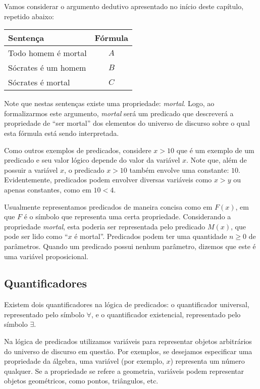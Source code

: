\begin{Example}
Vamos considerar o argumento dedutivo apresentado no início deste
capítulo, repetido abaixo:

\begin{table}[h]
  \begin{tabular}{|l|c|}
    \hline
    Sentença & Fórmula \\ \hline
    Todo homem é mortal & $A$ \\
    Sócrates é um homem & $B$ \\
    Sócrates é mortal & $C$ \\\hline
  \end{tabular}
  \centering
\end{table}
Note que nestas sentenças existe uma propriedade:
\textit{mortal}. Logo, ao formalizarmos este argumento,
\textit{mortal} será um predicado que descreverá a propriedade de
``ser mortal'' dos elementos do universo de discurso sobre o qual esta
fórmula está sendo interpretada.

Como outros exemplos de predicados, considere  $x > 10$ que é um exemplo de um predicado e seu
valor lógico depende do valor da variável $x$. Note que, além de
possuir a variável $x$, o predicado $x > 10$ também envolve uma
constante: $10$. Evidentemente,
predicados podem envolver diversas variáveis como $x > y$ ou
apenas constantes, como em $10 < 4$.
\end{Example}

Usualmente representamos predicados de maneira concisa como em $F(x)$,
em que $F$ é o símbolo que representa uma certa
propriedade. Considerando a propriedade \textit{mortal}, esta poderia
ser representada pelo predicado $M(x)$, que pode ser lido como ``$x$ é
mortal''. Predicados podem ter uma quantidade $n \geq 0$ de
parâmetros. Quando um predicado possui nenhum parâmetro, dizemos que
este é uma variável proposicional.

\subsection{Quantificadores}

Existem dois quantificadores na lógica de predicados: o quantificador universal,
representado pelo símbolo $\forall$, e o quantificador existencial,
representado pelo símbolo $\exists$.

Na lógica de predicados utilizamos variáveis para representar objetos
arbitrários do universo de discurso em questão. Por exemplos, se
desejamos especificar uma propriedade da álgebra, uma variável (por
exemplo, $x$) representa um número qualquer. Se a propriedade se
refere a geometria, variáveis podem representar objetos geométricos,
como pontos, triângulos, etc.

